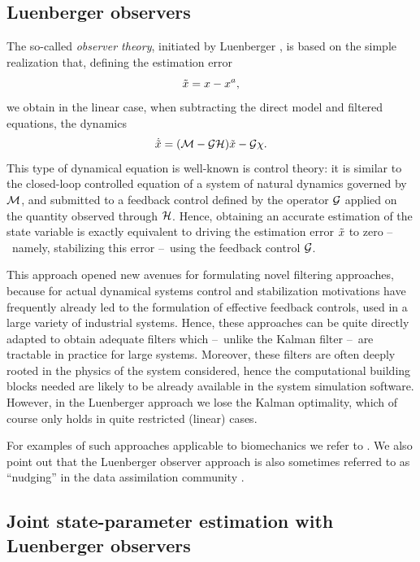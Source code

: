 \subsection{Luenberger observers}

The so-called \emph{observer theory}, initiated by Luenberger \cite{Luenberger63}, is based on the simple realization that, defining the estimation error
\[
	\tilde{x} = x - x^a,
\]
we obtain in the linear case, when subtracting the direct model and filtered equations, the dynamics
\begin{equation}
	\dot{\tilde{x}} = (\mathcal{M}-\mathcal{G}\mathcal{H}) \tilde{x} - \mathcal{G}\chi.
\end{equation}
This type of dynamical equation is well-known is control theory: it is similar to the closed-loop controlled equation of a system of natural dynamics governed by $\mathcal{M}$, and submitted to a feedback control defined by the operator $\mathcal{G}$ applied on the quantity observed through $\mathcal{H}$. Hence, obtaining an accurate estimation of the state variable is exactly equivalent to driving the estimation error $\tilde{x}$ to zero --~namely, stabilizing this error --~using the feedback control $\mathcal{G}$.

This approach opened new avenues for formulating novel filtering approaches, because for actual dynamical systems control and stabilization motivations have frequently already led to the formulation of effective feedback controls, used in a large variety of industrial systems. Hence, these approaches can be quite directly adapted to obtain adequate filters which --~unlike the Kalman filter --~are tractable in practice for large systems. Moreover, these filters are often deeply rooted in the physics of the system considered, hence the computational building blocks needed are likely to be already available in the system simulation software. However, in the Luenberger approach we lose the Kalman optimality, which of course only holds in quite restricted (linear) cases.

For examples of such approaches applicable to biomechanics we refer to \cite{PM-DC-PLT-09}. We also point out that the Luenberger observer approach is also sometimes referred to as ``nudging'' in the data assimilation community \cite{Auroux:2008p2884}.


\subsection{Joint state-parameter estimation with Luenberger observers}

